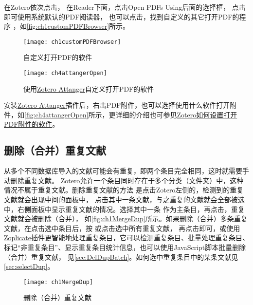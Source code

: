 \documentclass[theorem=false,mathfont=none,openany,sub3section]{easybook}
\begin{document}
在Zotero依次点击，
在Reader下面，点击Open PDFs Using后面的选择框，
点击 即可使用系统默认的PDF阅读器，
也可以点击，找到自定义的其它打开PDF的程序
，如\autoref{fig:ch1customPDFBrowser}所示。

	\begin{figure}
		\centering
		\texttt{[image: ch1customPDFBrowser]}
		\caption{自定义打开PDF的软件}
		\label{fig:ch1customPDFBrowser}
	\end{figure}
	
	
	\begin{figure}[ht]
		\centering
		\texttt{[image: ch4attangerOpen]}
		\caption{使用\href{https://github.com/MuiseDestiny/zotero-attanger}{Zotero Attanger}自定义打开PDF的软件}
		\label{fig:ch4attangerOpen}
	\end{figure}

安装\href{https://github.com/MuiseDestiny/zotero-attanger}{Zotero Attanger}插件后，右击PDF附件，也可以选择使用什么软件打开附件，如\autoref{fig:ch4attangerOpen}所示，更详细的介绍也可参见\href{https://zhuanlan.zhihu.com/p/373952017}
{Zotero如何设置打开PDF附件的软件}。


\subsection{删除（合并）重复文献}\label{sec:delDup}
从多个不同数据库导入的文献可能会有重复，即两个条目完全相同，这时就需要手动删除重复文献。
Zotero允许一个条目同时存在于多个分类（文件夹）中，这种情况不属于重复文献。删除重复文献的方法
是点击Zotero左侧的，检测到的重复文献就会出现中间的面板中，
点击其中一条文献，与之重复的文献就会全部被选中，右侧面板中显示重复文献的情况。选择其中一条
作为主条目，再点击，重复文献就会被删除（合并），
如\autoref{fig:ch1MergeDup}所示。如果删除（合并）多条重复文献，在点击选中条目后，按
或点击选中所有重复文献，
再点击即可，或使用\href{https://chenglongma.com/zoplicate/}{Zoplicate}插件更智能地处理重复条目，它可以检测重复条目、批量处理重复条目、标记“非重复条目”、显示重复条目统计信息，也可以使用JavaScript脚本批量删除（合并）重复文献，
见\cref{sec:DelDupBatch}。如何选中重复条目中的某条文献见\cref{sec:selectDup}。

\begin{figure}[htbp]
	\centering
	\texttt{[image: ch1MergeDup]}
	\caption{删除（合并）重复文献}
	\label{fig:ch1MergeDup}
\end{figure}
\end{document}
